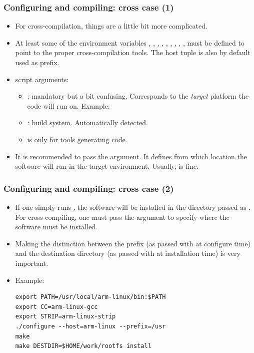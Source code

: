 \begin{frame}
  \frametitle{Configuring and compiling: cross case (1)}
  \begin{itemize}
  \item For cross-compilation, things are a little bit more complicated.
  \item At least some of the environment variables ,
    , , , , ,
    , , ,  must be
    defined to point to the proper cross-compilation tools. The host
    tuple is also by default used as prefix.
  \item {} script arguments:
    \begin{itemize}
    \item {}: mandatory but a bit confusing.
     Corresponds to the {\em target} platform the code will run on.
     Example: 
    \item {}: build system. Automatically detected.
    \item {} is only for tools generating code.
    \end{itemize}
  \item It is recommended to pass the  argument. It
    defines from which location the software will run in the target
    environment. Usually,  is fine.
  \end{itemize}
\end{frame}

\begin{frame}[fragile]
  \frametitle{Configuring and compiling: cross case (2)}
  \begin{itemize}
  \item If one simply runs , the software will be
    installed in the directory passed as . For
    cross-compiling, one must pass the  argument to
    specify where the software must be installed.
  \item Making the distinction between the prefix (as passed with
     at configure time) and the destination directory (as
    passed with  at installation time) is very important.
  \item Example:
\small
\begin{block}{}
\begin{verbatim}
export PATH=/usr/local/arm-linux/bin:$PATH
export CC=arm-linux-gcc
export STRIP=arm-linux-strip
./configure --host=arm-linux --prefix=/usr
make
make DESTDIR=$HOME/work/rootfs install
\end{verbatim}
\end{block}
  \end{itemize}
\end{frame}

